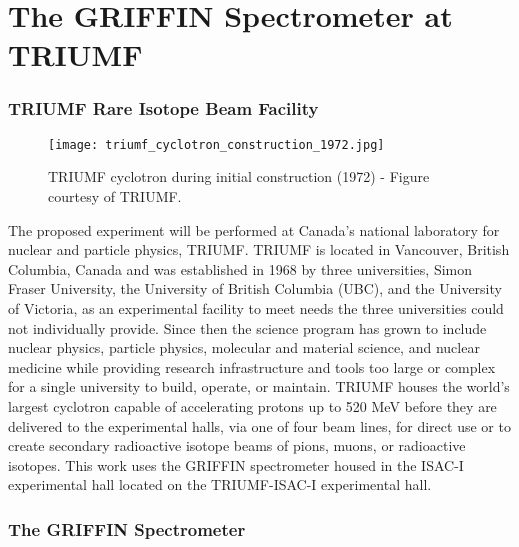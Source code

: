 \documentclass[cnatzke_thesis_proposal.tex]{subfiles}
\begin{document}
\chapter{The GRIFFIN Spectrometer at TRIUMF}

\subsection{TRIUMF Rare Isotope Beam Facility}
\begin{figure}[H]
  \begin{center}
    \texttt{[image: triumf\_cyclotron\_construction\_1972.jpg]}
  \end{center}
  \caption{TRIUMF cyclotron during initial construction (1972) - Figure courtesy of TRIUMF.}
  \label{fig:triumf_cyclotron_1972}
\end{figure}

The proposed experiment will be performed at Canada's national laboratory for nuclear and particle physics, TRIUMF. 
TRIUMF is located in Vancouver, British Columbia, Canada and was established in 1968 by three universities, Simon Fraser University, the University of British Columbia (UBC), and the University of Victoria, as an experimental facility to meet needs the three universities could not individually provide. 
Since then the science program has grown to include nuclear physics, particle physics, molecular and material science, and nuclear medicine while providing research infrastructure and tools too large or complex for a single university to build, operate, or maintain. 
TRIUMF houses the world's largest cyclotron \cite{dilling_isac_2014} capable of accelerating protons up to 520 MeV before they are delivered to the experimental halls, via one of four beam lines, for direct use or to create secondary radioactive isotope beams of pions, muons, or radioactive isotopes. 
This work uses the GRIFFIN spectrometer housed in the ISAC-I experimental hall located on the TRIUMF-ISAC-I experimental hall. 

\subsection{The GRIFFIN Spectrometer}

\end{document}
